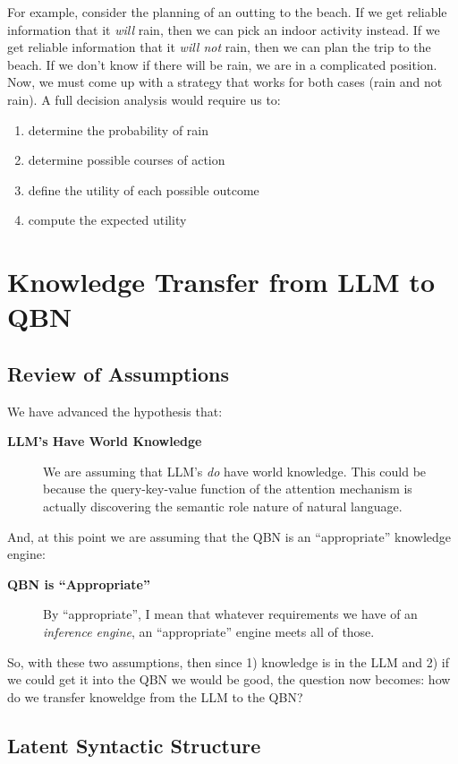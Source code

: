 \documentclass[12pt]{article}
\begin{document}
For example, consider the planning of an outting to the beach.
If we get reliable information that it {\em will} rain, then we can pick an indoor activity instead.
If we get reliable information that it {\em will not} rain, then we can plan the trip to the beach.
If we don't know if there will be rain, we are in a complicated position.
Now, we must come up with a strategy that works for both cases (rain and not rain).
A full decision analysis would require us to:
\begin{enumerate}
    \item determine the probability of rain
    \item determine possible courses of action
    \item define the utility of each possible outcome
    \item compute the expected utility
\end{enumerate}
\section{Knowledge Transfer from LLM to QBN}
\subsection{Review of Assumptions}
We have advanced the hypothesis that:
\begin{description}
    \item[\textbf{LLM's Have World Knowledge}] We are assuming that LLM's {\em do} have world knowledge. This could be because the query-key-value function of the attention mechanism is actually discovering the semantic role nature of natural language.
  \end{description}

And, at this point we are assuming that the QBN is an ``appropriate'' knowledge engine:
\begin{description}
    \item[\textbf{QBN is ``Appropriate''}] By ``appropriate'', I mean that whatever requirements we have of an {\em inference engine}, an ``appropriate'' engine meets all of those.
  \end{description}

So, with these two assumptions, then since 1) knowledge is in the LLM and 2) if we could get it into the QBN we would be good, the question now becomes: how do we transfer knoweldge from the LLM to the QBN?

\subsection{Latent Syntactic Structure}
\end{document}
